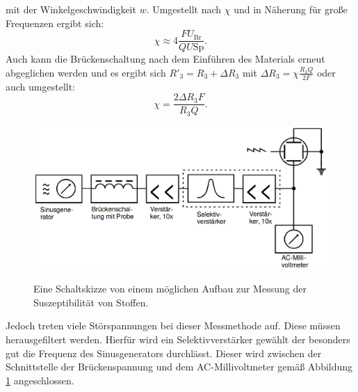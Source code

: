 mit der Winkelgeschwindigkeit $w$. Umgestellt nach $\chi$ und in Näherung für große Frequenzen ergibt sich:
\begin{equation}
	\chi\approx 4\frac{F U_\text{Br}}{Q U\text{Sp}}\text{.}\label{eq:SusU}
\end{equation}
Auch kann die Brückenschaltung nach dem Einführen des Materials erneut abgeglichen werden und es ergibt sich $R'_3 = R_3 + \Delta R_3 $ mit $\Delta R_3 = \chi \frac{R_3 Q}{2 F}$ oder auch umgestellt:
\begin{equation}
	\chi = \frac{2 \Delta R_3 F}{R_3 Q}\text{.}\label{eq:SusR}
\end{equation}
\begin{figure}
	\centering
	\caption{Eine Schaltskizze von einem möglichen Aufbau zur Messung der Suszeptibilität von Stoffen.}
	\includegraphics[width=\linewidth-70pt,height=\textheight-70pt,keepaspectratio]{content/images/Schaltskizze.png}
	\label{fig:Schaltskizze}
\end{figure}
Jedoch treten viele Störspannungen bei dieser Messmethode auf. Diese müssen herausgefiltert werden. Hierfür wird ein Selektivverstärker gewählt der besonders gut die Frequenz des Sinusgenerators durchlässt. Dieser wird zwischen der Schnittstelle der Brückenspannung und dem AC-Millivoltmeter gemäß Abbildung \ref{fig:Schaltskizze} angeschlossen.
